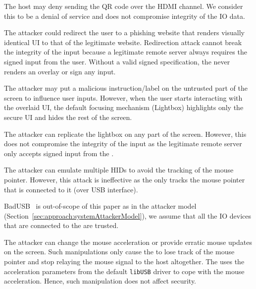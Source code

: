\parasave
{} The host may deny sending the QR code over the HDMI channel. We consider this to be a denial of service and does not compromise integrity of the IO data. 

\parasave
{} The attacker could redirect the user to a phishing website that renders visually identical UI to that of the legitimate website. Redirection attack cannot break the integrity of the input because a legitimate remote server always requires the signed input from the user. Without a valid signed specification, the \device never renders an overlay or sign any input. 

\parasave
{} The attacker may put a malicious instruction/label on the untrusted part of the screen to influence user inputs. However, when the user starts interacting with the overlaid UI, the default focusing mechanism (Lightbox) highlights only the secure UI and hides the rest of the screen. 

\parasave
{} The attacker can replicate the lightbox on any part of the screen. However, this does not compromise the integrity of the input as the legitimate remote server only accepts signed input from the \device. 

\parasave
{} The attacker can emulate multiple HIDs to avoid the tracking of the mouse pointer. However, this attack is ineffective as the \device only tracks the mouse pointer that is connected to it (over USB interface). 

\parasave
{} BadUSB~\cite{badUSB} is out-of-scope of this paper as in the attacker model (Section~\ref{sec:approach:systemAttackerModel}), we assume that all the IO devices that are connected to the \device are trusted.

\parasave
{} The attacker can change the mouse acceleration or provide erratic mouse updates on the screen. Such manipulations only cause the \device to lose track of the mouse pointer and stop relaying the mouse signal to the host altogether. The \device uses the acceleration parameters from the default \texttt{libUSB} driver to cope with the mouse acceleration. Hence, such manipulation does not affect security.

